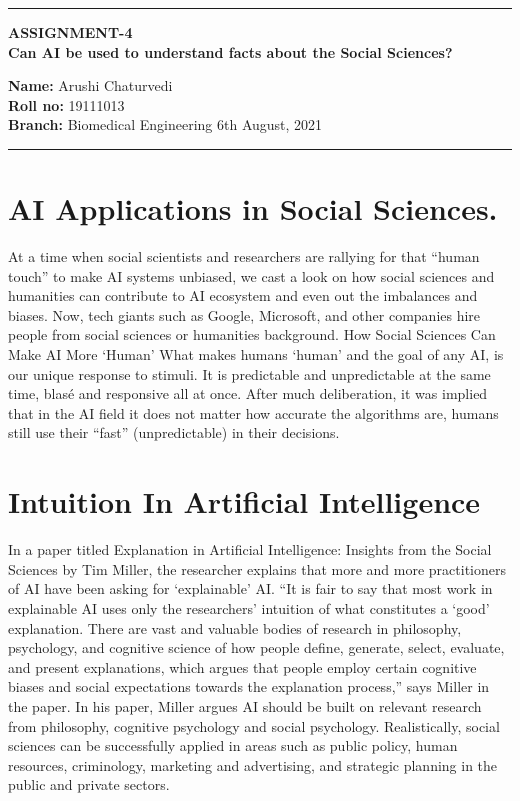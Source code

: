 \documentclass[10pt,a4paper,twoside]{article}
\begin{document}
\begin{center}
\hrule

\vspace{.4cm}
{\bf {\Large ASSIGNMENT-4 }}\\
\vspace{.3cm}
{\bf {\huge Can AI be used to understand facts about the Social Sciences?}}
\vspace{.3cm}
\end{center}
{\bf Name:}  Arushi Chaturvedi\\
{\bf Roll no:}  19111013 \\
{\bf Branch: }  Biomedical Engineering \hspace{\fill}  6th August, 2021 \\
\hrule

\vspace{.5cm}
\section{AI Applications in Social Sciences.} 

At a time when social scientists and researchers are rallying for that “human touch” to make AI systems unbiased, we cast a look on how social sciences and humanities can contribute to AI ecosystem and even out the imbalances and biases.
Now, tech giants such as Google, Microsoft, and other companies hire people from social sciences or humanities background.
How Social Sciences Can Make AI More ‘Human’ What makes humans ‘human’ and the goal of any AI, is our unique response to stimuli.
It is predictable and unpredictable at the same time, blasé and responsive all at once.
After much deliberation, it was implied that in the AI field it does not matter how accurate the algorithms are, humans still use their “fast” (unpredictable) in their decisions.

\section{Intuition In Artificial Intelligence}

In a paper titled Explanation in Artificial Intelligence: Insights from the Social Sciences by Tim Miller, the researcher explains that more and more practitioners of AI have been asking for ‘explainable’ AI.
“It is fair to say that most work in explainable AI uses only the researchers’ intuition of what constitutes a ‘good’ explanation.
There are vast and valuable bodies of research in philosophy, psychology, and cognitive science of how people define, generate, select, evaluate, and present explanations, which argues that people employ certain cognitive biases and social expectations towards the explanation process,” says Miller in the paper.
In his paper, Miller argues AI should be built on relevant research from philosophy, cognitive psychology and social psychology.
Realistically, social sciences can be successfully applied in areas such as public policy, human resources, criminology, marketing and advertising, and strategic planning in the public and private sectors.
\end{document}

